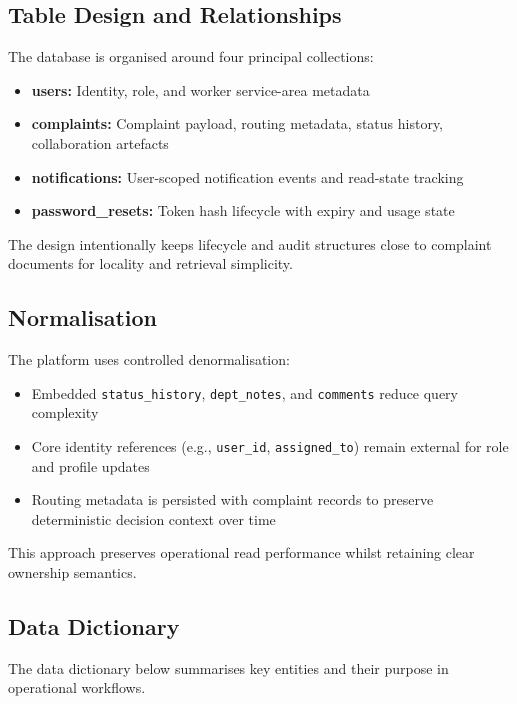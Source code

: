\subsection{Table Design and Relationships}

The database is organised around four principal collections:

\begin{itemize}
\item \textbf{users:} Identity, role, and worker service-area metadata
\item \textbf{complaints:} Complaint payload, routing metadata, status history, collaboration artefacts
\item \textbf{notifications:} User-scoped notification events and read-state tracking
\item \textbf{password\_resets:} Token hash lifecycle with expiry and usage state
\end{itemize}

The design intentionally keeps lifecycle and audit structures close to complaint documents for locality and retrieval simplicity.

\subsection{Normalisation}

The platform uses controlled denormalisation:

\begin{itemize}
\item Embedded \texttt{status\_history}, \texttt{dept\_notes}, and \texttt{comments} reduce query complexity
\item Core identity references (e.g., \texttt{user\_id}, \texttt{assigned\_to}) remain external for role and profile updates
\item Routing metadata is persisted with complaint records to preserve deterministic decision context over time
\end{itemize}

This approach preserves operational read performance whilst retaining clear ownership semantics.

\subsection{Data Dictionary}

The data dictionary below summarises key entities and their purpose in operational workflows.

